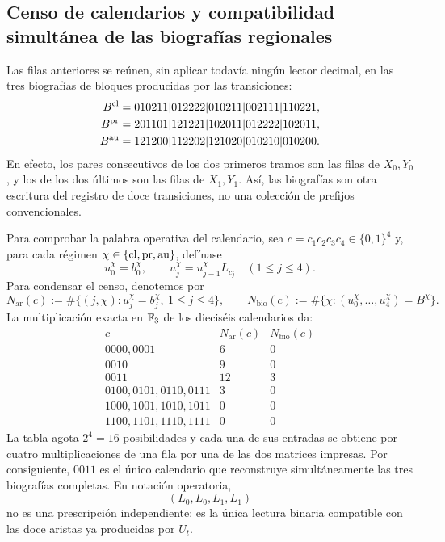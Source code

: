 \begingroup\fontsize{10}{11.8}\selectfont\setlength{\abovedisplayskip}{5pt}\setlength{\belowdisplayskip}{5pt}
\subsection{Censo de calendarios y compatibilidad simultánea de las biografías regionales}
Las filas anteriores se reúnen, sin aplicar todavía ningún lector decimal,
en las tres biografías de bloques producidas por las transiciones:
\begin{align}
 B^{\rm cl}
  &=010211|012222|010211|002111|110221,\notag\\
 B^{\rm pr}
  &=201101|121221|102011|012222|102011,
 \label{act21:eq:biografias-tpk-tres-caracteres}\\
 B^{\rm au}
  &=121200|112202|121020|010210|010200.\notag
\end{align}
En efecto, los pares consecutivos de los dos primeros tramos son las filas
de \(X_0,Y_0\), y los de los dos últimos son las filas de \(X_1,Y_1\).
Así, las biografías son otra escritura del registro de doce transiciones, no
una colección de prefijos convencionales.

Para comprobar la palabra operativa del calendario, sea
\(c=c_1c_2c_3c_4\in\{0,1\}^4\) y, para cada régimen
\(\chi\in\{{\rm cl},{\rm pr},{\rm au}\}\), defínase
\[
 u_0^\chi=b_0^\chi,\qquad
 u_j^\chi=u_{j-1}^\chi L_{c_j}\quad(1\le j\le4).
\]
Para condensar el censo, denotemos por
\[
 N_{\mathrm{ar}}(c):=
 \#\{(j,\chi):u_j^\chi=b_j^\chi,\ 1\le j\le4\},\qquad
 N_{\mathrm{bio}}(c):=
 \#\{\chi:(u_0^\chi,\ldots,u_4^\chi)=B^\chi\}.
\]
La multiplicación exacta en \(\mathbb F_3\) de los dieciséis calendarios da:
\[
\begin{array}{c|c|c}
 c&N_{\mathrm{ar}}(c)&N_{\mathrm{bio}}(c)\\ \hline
0000,0001&6&0\\
0010&9&0\\
0011&12&3\\
0100,0101,0110,0111&3&0\\
1000,1001,1010,1011&0&0\\
1100,1101,1110,1111&0&0
\end{array}
\tag{D}
\label{act21:eq:censo-dieciseis-calendarios}
\]
La tabla agota \(2^4=16\) posibilidades y cada una de sus entradas se obtiene
por cuatro multiplicaciones de una fila por una de las dos matrices impresas.
Por consiguiente, \(0011\) es el único calendario que reconstruye
simultáneamente las tres biografías completas. En notación operatoria,
\begin{equation}
 (L_0,L_0,L_1,L_1)
 \label{act21:eq:calendario-0011-interno}
\end{equation}
no es una prescripción independiente: es la única lectura binaria compatible
con las doce aristas ya producidas por \(U_t\).

